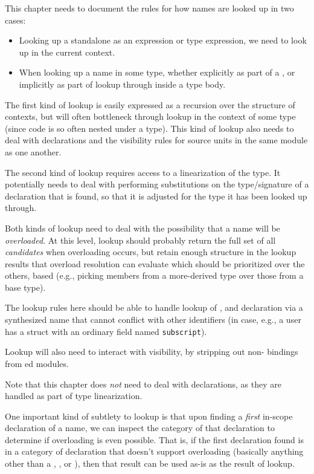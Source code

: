 
\begin{TODO}

This chapter needs to document the rules for how names are looked up in two cases:

\begin{itemize}
\item Looking up a standalone  as an expression or type expression, we need to look up in the current context.
\item When looking up a name in some type, whether explicitly as part of a , or implicitly as part of lookup through  inside a type body.
\end{itemize}

The first kind of lookup is easily expressed as a recursion over the structure of contexts, but will often bottleneck through lookup in the context of some type (since code is so often nested under a type).
This kind of lookup also needs to deal with  declarations and the visibility rules for source units in the same module as one another.

The second kind of lookup requires access to a linearization of the type.
It potentially needs to deal with performing substitutions on the type/signature of a declaration that is found, so that it is adjusted for the  type it has been looked up through.

Both kinds of lookup need to deal with the possibility that a name will be \emph{overloaded}.
At this level, lookup should probably return the full set of all \emph{candidates} when overloading occurs, but retain enough structure in the lookup results that overload resolution can evaluate which should be prioritized over the others, based (e.g., picking members from a more-derived type over those from a base type).

The lookup rules here should be able to handle lookup of , and  declaration via a synthesized name that cannot conflict with other identifiers (in case, e.g., a user has a struct with an ordinary field named \texttt{subscript}).

Lookup will also need to interact with visibility, by stripping out non- bindings from ed modules.

Note that this chapter does \emph{not} need to deal with  declarations, as they are handled as part of type linearization.

One important kind of subtlety to lookup is that upon finding a \emph{first} in-scope declaration of a name, we can inspect the category of that declaration to determine if overloading is even possible.
That is, if the first declaration found is in a category of declaration that doesn't support overloading (basically anything other than a , , or ), then that result can be used as-is as the result of lookup.

\end{TODO}
